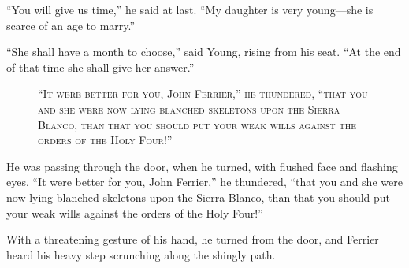\documentclass[12pt,english,oneside]{book}
\newcommand{\noun}[1]{\textsc{#1}}
\newcommand{\mdsh}[1]{\mbox{#1}\linebreak[1]}
\begin{document}
{}``You will give us time,'' he said at last. {}``My daughter is
very young\mdsh{---}she is scarce of an age to marry.''

{}``She shall have a month to choose,'' said Young, rising from
his seat. {}``At the end of that time she shall give her answer.''

%
\begin{figure}[htbp]
\noindent {}

\noindent \begin{center}\noun{{}``It were better for you, John
Ferrier,'' he thundered, {}``that you and she were now lying blanched
skeletons upon the Sierra Blanco, than that you should put your weak
wills against the orders of the Holy Four!''}\end{center}
\end{figure}
He was passing through the door, when he turned, with flushed face
and flashing eyes. {}``It were better for you, John Ferrier,'' he
thundered, {}``that you and she were now lying blanched skeletons
upon the Sierra Blanco, than that you should put your weak wills against
the orders of the Holy Four!''

With a threatening gesture of his hand, he turned from the door, and
Ferrier heard his heavy step scrunching along the shingly path.
\end{document}
